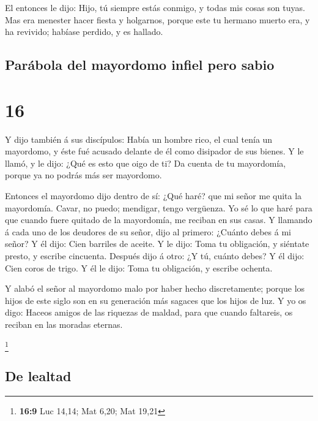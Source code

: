  El entonces le dijo: Hijo, tú siempre estás conmigo, y
todas mis cosas son tuyas.  Mas era menester hacer fiesta
y holgarnos, porque este tu hermano muerto era, y ha revivido; habíase
perdido, y es hallado.

\hypertarget{paruxe1bola-del-mayordomo-infiel-pero-sabio}{%
\subsection{Parábola del mayordomo infiel pero
sabio}\label{paruxe1bola-del-mayordomo-infiel-pero-sabio}}

\hypertarget{section-15}{%
\section{16}\label{section-15}}

 Y dijo también á sus discípulos: Había un hombre rico, el
cual tenía un mayordomo, y éste fué acusado delante de él como disipador
de sus bienes.  Y le llamó, y le dijo: ¿Qué es esto que
oigo de ti? Da cuenta de tu mayordomía, porque ya no podrás más ser
mayordomo.

 Entonces el mayordomo dijo dentro de sí: ¿Qué haré? que
mi señor me quita la mayordomía. Cavar, no puedo; mendigar, tengo
vergüenza.  Yo sé lo que haré para que cuando fuere
quitado de la mayordomía, me reciban en sus casas.  Y
llamando á cada uno de los deudores de su señor, dijo al primero:
¿Cuánto debes á mi señor?  Y él dijo: Cien barriles de
aceite. Y le dijo: Toma tu obligación, y siéntate presto, y escribe
cincuenta.  Después dijo á otro: ¿Y tú, cuánto debes? Y él
dijo: Cien coros de trigo. Y él le dijo: Toma tu obligación, y escribe
ochenta.

 Y alabó el señor al mayordomo malo por haber hecho
discretamente; porque los hijos de este siglo son en su generación más
sagaces que los hijos de luz.  Y yo os digo: Haceos amigos
de las riquezas de maldad, para que cuando faltareis, os reciban en las
moradas eternas.

\footnote{\textbf{16:9} Luc 14,14; Mat 6,20; Mat 19,21}

\hypertarget{de-lealtad}{%
\subsection{De lealtad}\label{de-lealtad}}

